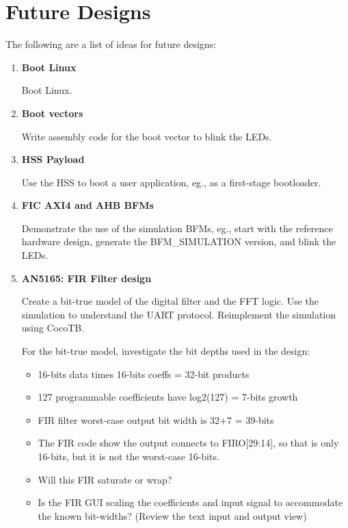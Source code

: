 \section{Future Designs}
\label{sec:future}

The following are a list of ideas for future designs:
%
\begin{enumerate}
\item \textbf{Boot Linux}

Boot Linux.

\item \textbf{Boot vectors}

Write assembly code for the boot vector to blink the LEDs.

\item \textbf{HSS Payload}

Use the HSS to boot a user application, eg., as a first-stage bootloader.

\item \textbf{FIC AXI4 and AHB BFMs}

Demonstrate the use of the simulation BFMs, eg., start with the reference
hardware design, generate the BFM\_SIMULATION version, and blink the LEDs.

\item \textbf{AN5165: FIR Filter design}

Create a bit-true model of the digital filter and the FFT logic.
Use the simulation to understand the UART protocol.
Reimplement the simulation using CocoTB.

For the bit-true model, investigate the bit depths used in the design:
%
\begin{itemize}
\item 16-bits data times 16-bits coeffs = 32-bit products
\item 127 programmable coefficients have log2(127) = 7-bits growth
\item FIR filter worst-case output bit width is 32+7 = 39-bits
\item The FIR code show the output connects to FIRO[29:14], so that is
only 16-bits, but it is not the worst-case 16-bits.
\item Will this FIR saturate or wrap?
\item Is the FIR GUI scaling the coefficients and input signal to
accommodate the known bit-widths? (Review the text input and output view)
\end{itemize}


\end{enumerate}

